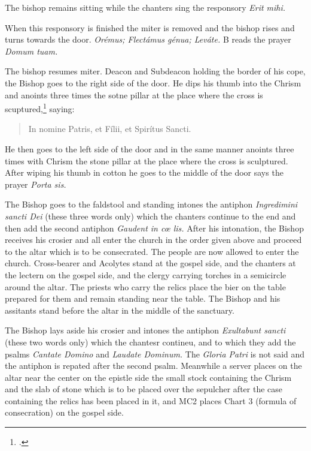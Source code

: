 \documentclass[letterpaper]{report}
\newcommand\src{\textsc{S.R.C.}}
\begin{document}
{\rubric The bishop remains sitting while the chanters sing the responsory
\textit{Erit mihi.}

\rubric When this responsory is finished the miter is removed and the bishop
rises and turns towards the door. \textit{Orémus; Flectámus génua; Leváte.} B
reads the prayer \textit{Domum tuam.}

\rubric The bishop resumes miter. Deacon and Subdeacon holding the border of
his cope, the Bishop goes to the right side of the door. He dips his thumb into
the Chrism and anoints three times the sotne pillar at the place where the
cross is scuptured,\footcite[The Pontifical says ''\textit{signat ostium,''}
which the \src, Aug. 7, 1875, n. 3364 ad VI, interprets to mean the two stone
or brick pillars at the sides of the door.][footnote 1, p. 83.]{consecranda}
saying:

\begin{quote}
   In nomine Pa\cross tris, et Fí\cross lii, et Spirítus \cross Sancti.
\end{quote}

He then goes to the left side of the door and in the same manner anoints three
times with Chrism the stone pillar at the place where the cross is sculptured.
After wiping his thumb in cotton he goes to the middle of the door says the
prayer \textit{Porta sis.}

\rubric The Bishop goes to the faldstool and standing intones the antiphon
\textit{Ingredimini sancti Dei} (these three words only) which the chanters
continue to the end and then add the second antiphon \textit{Gaudent in c\oe
lis.} After his intonation, the Bishop receives his crosier and all enter the
church in the order given above and proceed to the altar which is to be
consecrated. The people are now allowed to enter the church. Cross-bearer and
Acolytes stand at the gospel side, and the chanters at the lectern on the
gospel side, and the clergy carrying torches in a semicircle around the altar.
The priests who carry the relics place the bier on the table prepared for them
and remain standing near the table. The Bishop and his assitants stand before
the altar in the middle of the sanctuary.

\rubric The Bishop lays aside his crosier and intones the antiphon
\textit{Exultabunt sancti} (these two words only) which the chantesr contineu,
and to which they add the psalms \textit{Cantate Domino} and \textit{Laudate
Dominum.} The \textit{Gloria Patri} is not said and the antiphon is repated
after the second psalm. Meanwhile a server places on the altar near the center
on the epistle side the small stock containing the Chrism and the slab of stone
which is to be placed over the sepulcher after the case containing the relics
has been placed in it, and MC2 places Chart 3 (formula of consecration) on the
gospel side.

}
\end{document}
